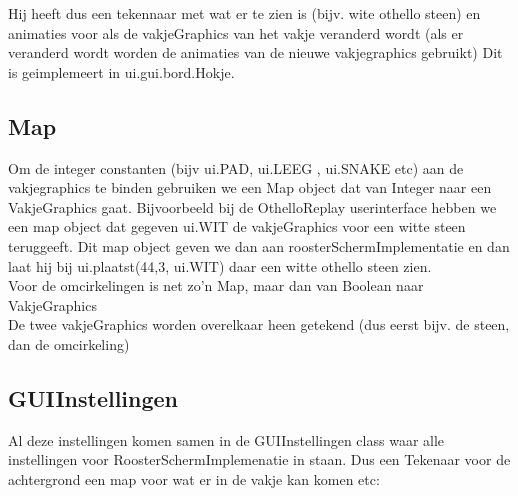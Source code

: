 \documentclass[a4paper,10pt]{article}
\begin{document}
Hij heeft dus een tekennaar met wat er te zien is (bijv. wite othello steen) en animaties voor als de vakjeGraphics van het vakje veranderd wordt (als er veranderd wordt worden de animaties van de nieuwe vakjegraphics gebruikt) Dit is geimplemeert in ui.gui.bord.Hokje. 

\subsection{Map}

Om de integer constanten (bijv ui.PAD, ui.LEEG , ui.SNAKE etc)  aan de vakjegraphics te binden gebruiken we een Map object dat van Integer naar een VakjeGraphics gaat. Bijvoorbeeld bij de OthelloReplay userinterface hebben we een map object dat gegeven ui.WIT de vakjeGraphics voor een witte steen teruggeeft. Dit map object geven we dan aan roosterSchermImplementatie en dan laat hij bij ui.plaatst(44,3, ui.WIT) daar een witte othello steen zien. \\

Voor de omcirkelingen is net zo'n Map, maar dan van Boolean naar VakjeGraphics\\

De twee vakjeGraphics worden overelkaar heen getekend (dus eerst bijv. de steen, dan de omcirkeling)

\subsection{GUIInstellingen}

Al deze instellingen komen samen in de GUIInstellingen class waar alle instellingen voor RoosterSchermImplemenatie in staan. Dus een Tekenaar voor de achtergrond een map voor wat er in de vakje kan komen etc:
\end{document}
